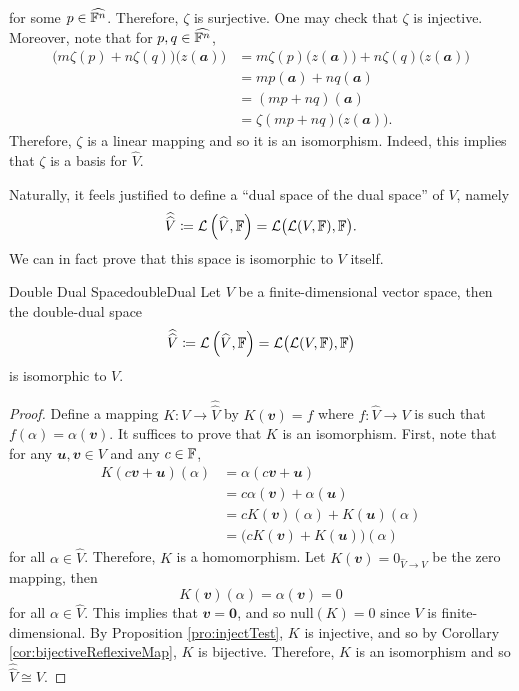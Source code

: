 \documentclass[math, code]{amznotes}
\theoremstyle{remark}
\newcommand{\zero}{\mathbf{0}}
\begin{document}
for some $p \in \widehat{\mathbb{F}^n}$. Therefore, $\zeta$ is surjective. One may check that $\zeta$ is injective. Moreover, note that for $p, q \in \widehat{\mathbb{F}^n}$,
\begin{align*}
    \bigl(m\zeta(p) + n\zeta(q)\bigr)\bigl(z(\mathbfit{a})\bigr) & = m\zeta(p)\bigl(z(\mathbfit{a})\bigr) + n\zeta(q)\bigl(z(\mathbfit{a})\bigr) \\
    & = mp(\mathbfit{a}) + nq(\mathbfit{a}) \\
    & = (mp + nq)(\mathbfit{a}) \\
    & = \zeta(mp + nq)\bigl(z(\mathbfit{a})\bigr).
\end{align*}
Therefore, $\zeta$ is a linear mapping and so it is an isomorphism. Indeed, this implies that $\zeta$ is a basis for $\widehat{V}$.

Naturally, it feels justified to define a ``dual space of the dual space'' of $V$, namely 
\begin{equation*}
    \widehat{\widehat{V}} \coloneqq \mathcal{L}\left(\widehat{V}, \mathbb{F}\right) = \mathcal{L}\bigl(\mathcal{L}(V, \mathbb{F}), \mathbb{F}\bigr).
\end{equation*}
We can in fact prove that this space is isomorphic to $V$ itself. 
\begin{probox}{Double Dual Space}{doubleDual}
    Let $V$ be a finite-dimensional vector space, then the double-dual space 
    \begin{equation*}
        \widehat{\widehat{V}} \coloneqq \mathcal{L}\left(\widehat{V}, \mathbb{F}\right) = \mathcal{L}\bigl(\mathcal{L}(V, \mathbb{F}), \mathbb{F}\bigr)
    \end{equation*}
    is isomorphic to $V$.
    \tcblower
    \begin{proof}
        Define a mapping $K \colon V \to \widehat{\widehat{V}}$ by $K(\mathbfit{v}) = f$ where $f \colon \widehat{V} \to V$ is such that $f(\alpha) = \alpha(\mathbfit{v})$. It suffices to prove that $K$ is an isomorphism. First, note that for any $\mathbfit{u}, \mathbfit{v} \in V$ and any $c \in \mathbb{F}$,
        \begin{align*}
            K(c\mathbfit{v} + \mathbfit{u})(\alpha) & = \alpha(c\mathbfit{v} + \mathbfit{u}) \\
            & = c\alpha(\mathbfit{v}) + \alpha(\mathbfit{u}) \\
            & = cK(\mathbfit{v})(\alpha) + K(\mathbfit{u})(\alpha) \\
            & = \bigl(cK(\mathbfit{v}) + K(\mathbfit{u})\bigr)(\alpha)
        \end{align*}
        for all $\alpha \in \widehat{V}$. Therefore, $K$ is a homomorphism. Let $K(\mathbfit{v}) = 0_{\widehat{V} \to V}$ be the zero mapping, then 
        \begin{equation*}
            K(\mathbfit{v})(\alpha) = \alpha(\mathbfit{v}) = 0
        \end{equation*}
        for all $\alpha \in \widehat{V}$. This implies that $\mathbfit{v} = \zero$, and so $\mathrm{null}(K) = 0$ since $V$ is finite-dimensional. By Proposition \ref{pro:injectTest}, $K$ is injective, and so by Corollary \ref{cor:bijectiveReflexiveMap}, $K$ is bijective. Therefore, $K$ is an isomorphism and so $\widehat{\widehat{V}} \cong V$.
    \end{proof}
\end{probox}
\end{document}
